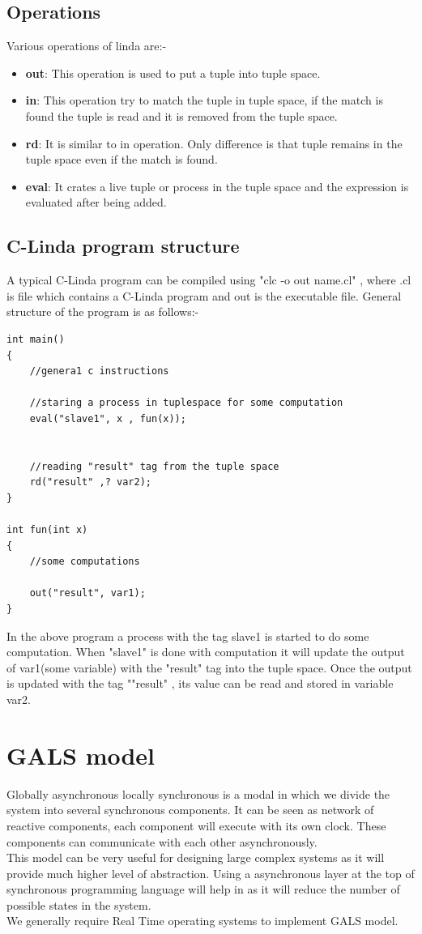\documentclass[16pt]{report}
\begin{document}
\subsection{Operations}
Various operations of linda are:-
\begin{itemize}
    \item \textbf{out}: This operation is used to put a tuple into tuple space.
    \item \textbf{in}: This operation try to match the tuple in tuple space, if the match is found the tuple is read and it is removed from the tuple space.
    \item \textbf{rd}: It is similar to in operation. Only difference is that tuple remains in the tuple space even if the match is found.
    \item \textbf{eval}: It crates a live tuple or process in the tuple space and the expression is evaluated after being added.
\end{itemize}

\subsection{C-Linda program structure}
A typical C-Linda program can be compiled using "clc -o out name.cl" , where .cl is file which contains a C-Linda program and out is the executable file.
General structure of the program is as follows:-
\begin{verbatim}
int main()
{
    //genera1 c instructions
    
    //staring a process in tuplespace for some computation
    eval("slave1", x , fun(x));
    
    
    //reading "result" tag from the tuple space
    rd("result" ,? var2);
}

int fun(int x)
{
    //some computations
    
    out("result", var1);
}

\end{verbatim}{}


In the above program a process with the tag slave1 is started to do some computation. When "slave1" is done with computation it will update the output of var1(some variable) with the "result" tag into the tuple space. Once the output is updated with the tag ""result" , its value can be read and stored in variable var2.

\section{GALS model}
Globally asynchronous locally synchronous is a modal in which we divide the system into several synchronous components. It can be seen as network of reactive components, each component will execute with its own clock. These components can communicate with each other asynchronously.\\
This model can be very useful for designing large complex systems as it will provide much higher level of abstraction. Using a asynchronous layer at the top of synchronous programming language will help in as it will reduce the number of possible states in the system.\\
We generally require Real Time operating systems to implement GALS model.
\end{document}
